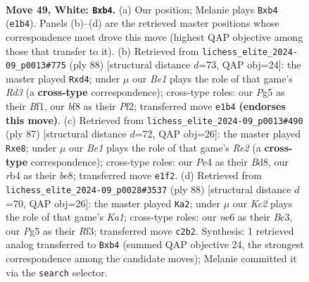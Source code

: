 \documentclass[11pt]{article}
\begin{document}
\clearpage

\begin{figure}[p]\centering
\begin{subfigure}{0.46\textwidth}\centering
\resizebox{\linewidth}{!}{%
\newchessgame
\chessboard[
  setfen={3r1b2/7p/p2pn1k1/P3p1Pp/1rP1P3/1P3PR1/2K3B1/4B3 w - - 0 49},
  showmover=false,
  pgfstyle=straightmove, color=movearrow, markmove={e1-b4}
]}
\caption{}
\end{subfigure}\hfill
\begin{subfigure}{0.46\textwidth}\centering
\resizebox{\linewidth}{!}{%
\newchessgame
\chessboard[
  setfen={4rk2/6p1/1p1npp2/pP1b4/P2n3p/3R3P/5PP1/3R1BK1 w - - 0 45},
  showmover=false,
  pgfstyle=straightmove, color=movearrow, markmove={d3-d4}
]}
\caption{}
\end{subfigure}
\\[4pt]
\begin{subfigure}{0.46\textwidth}\centering
\resizebox{\linewidth}{!}{%
\newchessgame
\chessboard[
  setfen={3bB1k1/1p2rp2/1P5p/p1PpPRp1/P7/2P3P1/6K1/7R b - - 0 44},
  showmover=false,
  pgfstyle=straightmove, color=movearrow, markmove={e7-e8}
]}
\caption{}
\end{subfigure}\hfill
\begin{subfigure}{0.46\textwidth}\centering
\resizebox{\linewidth}{!}{%
\newchessgame
\chessboard[
  setfen={7r/4kp2/2n1p3/1p1pP3/p3rPP1/P1B2R1P/2P2R2/K7 w - - 17 45},
  showmover=false,
  pgfstyle=straightmove, color=movearrow, markmove={a1-a2}
]}
\caption{}
\end{subfigure}
\caption{\textbf{Move 49, White: \texttt{Bxb4}.} (a) Our position; Melanie plays \texttt{Bxb4} (\texttt{e1b4}). Panels (b)--(d) are the retrieved master positions whose correspondence most drove this move (highest QAP objective among those that transfer to it). (b) Retrieved from \texttt{lichess\_elite\_2024-09\_p0013\#775} (ply 88) [structural distance $d$=73, QAP obj=24]: the master played \texttt{Rxd4}; under $\mu$ our \emph{Be1} plays the role of that game's \emph{Rd3} (a \textbf{cross-type} correspondence); cross-type roles: our \emph{P}g5 as their \emph{B}f1, our \emph{b}f8 as their \emph{P}f2; transferred move \texttt{e1b4} \textbf{(endorses this move)}. (c) Retrieved from \texttt{lichess\_elite\_2024-09\_p0013\#490} (ply 87) [structural distance $d$=72, QAP obj=26]: the master played \texttt{Rxe8}; under $\mu$ our \emph{Be1} plays the role of that game's \emph{Re2} (a \textbf{cross-type} correspondence); cross-type roles: our \emph{P}e4 as their \emph{B}d8, our \emph{r}b4 as their \emph{b}e8; transferred move \texttt{e1f2}. (d) Retrieved from \texttt{lichess\_elite\_2024-09\_p0028\#3537} (ply 88) [structural distance $d$=70, QAP obj=26]: the master played \texttt{Ka2}; under $\mu$ our \emph{Kc2} plays the role of that game's \emph{Ka1}; cross-type roles: our \emph{n}e6 as their \emph{B}c3, our \emph{P}g5 as their \emph{R}f3; transferred move \texttt{c2b2}. Synthesis: 1 retrieved analog transferred to \texttt{Bxb4} (summed QAP objective 24, the strongest correspondence among the candidate moves); Melanie committed it via the \texttt{search} selector.}
\label{fig:thought-m96}
\end{figure}
\end{document}
